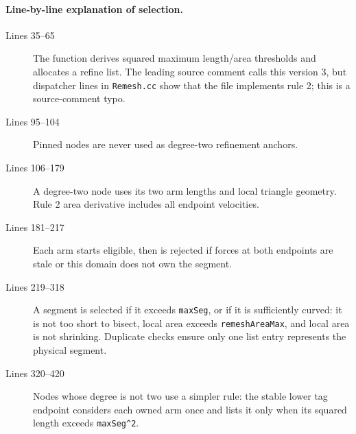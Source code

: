 \documentclass[11pt]{article}
\newcommand{\code}[1]{\texorpdfstring{\nolinkurl{#1}}{#1}}
\newcommand{\srcfile}[1]{\texorpdfstring{\nolinkurl{#1}}{#1}}
\begin{document}




\paragraph{Line-by-line explanation of selection.}
\begin{description}
\item[Lines 35--65] The function derives squared maximum length/area
thresholds and allocates a refine list. The leading source comment calls this
version 3, but dispatcher lines in \srcfile{Remesh.cc} show that the file
implements rule 2; this is a source-comment typo.
\item[Lines 95--104] Pinned nodes are never used as degree-two refinement
anchors.
\item[Lines 106--179] A degree-two node uses its two arm lengths and local
triangle geometry. Rule 2 area derivative includes all endpoint velocities.
\item[Lines 181--217] Each arm starts eligible, then is rejected if forces at
both endpoints are stale or this domain does not own the segment.
\item[Lines 219--318] A segment is selected if it exceeds \code{maxSeg}, or
if it is sufficiently curved: it is not too short to bisect, local area
exceeds \code{remeshAreaMax}, and local area is not shrinking. Duplicate
checks ensure only one list entry represents the physical segment.
\item[Lines 320--420] Nodes whose degree is not two use a simpler rule: the
stable lower tag endpoint considers each owned arm once and lists it only when
its squared length exceeds \code{maxSeg^2}.
\end{description}


\end{document}
